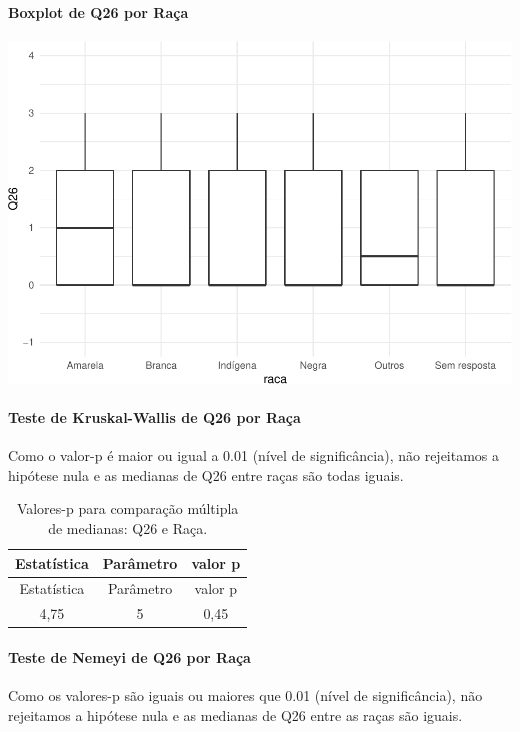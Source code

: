 \documentclass[]{article}
\let\oldparagraph\paragraph
\renewcommand{\paragraph}[1]{\oldparagraph{#1}\mbox{}}
\begin{document}
\hypertarget{boxplot-de-q26-por-rauxe7a}{%
\paragraph{Boxplot de Q26 por Raça}\label{boxplot-de-q26-por-rauxe7a}}

\begin{center}\includegraphics[width=0.75\linewidth]{relatorio_covid19_files/figure-latex/unnamed-chunk-756-1} \end{center}

\hypertarget{teste-de-kruskal-wallis-de-q26-por-rauxe7a}{%
\paragraph{Teste de Kruskal-Wallis de Q26 por Raça}\label{teste-de-kruskal-wallis-de-q26-por-rauxe7a}}

Como o valor-p é maior ou igual a 0.01 (nível de significância), não rejeitamos a hipótese nula e as medianas de Q26 entre raças são todas iguais.

\begin{longtable}[]{@{}ccc@{}}
\caption{\label{tab:unnamed-chunk-758}Valores-p para comparação múltipla de medianas: Q26 e Raça.}\tabularnewline
\toprule
Estatística & Parâmetro & valor p\tabularnewline
\midrule
\endfirsthead
\toprule
Estatística & Parâmetro & valor p\tabularnewline
\midrule
\endhead
4,75 & 5 & 0,45\tabularnewline
\bottomrule
\end{longtable}

\hypertarget{teste-de-nemeyi-de-q26-por-rauxe7a}{%
\paragraph{Teste de Nemeyi de Q26 por Raça}\label{teste-de-nemeyi-de-q26-por-rauxe7a}}

Como os valores-p são iguais ou maiores que 0.01 (nível de significância), não rejeitamos a hipótese nula e as medianas de Q26 entre as raças são iguais.
\end{document}
